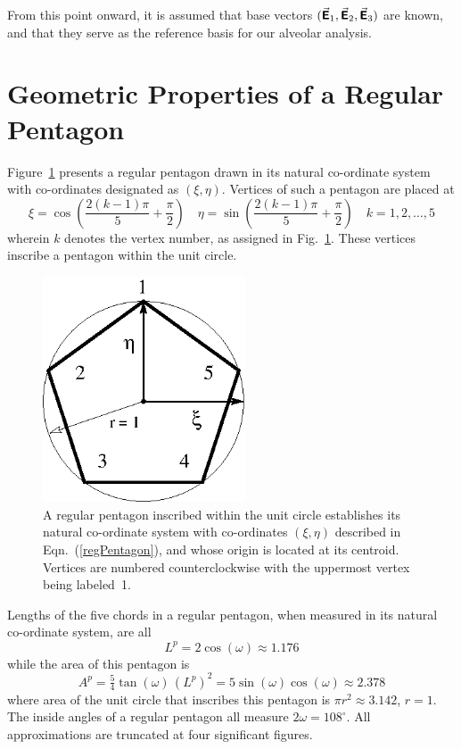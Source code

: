 From this point onward, it is assumed that base vectors $( \vec{\boldsymbol{\mathsf{E}}}_1 , \vec{\boldsymbol{\mathsf{E}}}_2 , \vec{\boldsymbol{\mathsf{E}}}_3 )$ are known, and that they serve as the reference basis for our alveolar analysis.

\section{Geometric Properties of a Regular Pentagon}
\label{sec:pentagonGeometry}

Figure~\ref{figRegPentagon} presents a regular pentagon drawn in its natural co-ordinate system with co-ordinates designated as $(\xi, \eta)$.  Vertices of such a pentagon are placed at
\begin{equation}
	\xi = \cos \left( \frac{2(k-1)\pi}{5} + \frac{\pi}{2} \right) \quad
	\eta = \sin \left( \frac{2(k-1)\pi}{5} + \frac{\pi}{2} \right) \quad
	k = 1, 2, \ldots, 5
	\label{regPentagon}
\end{equation}
wherein $k$ denotes the vertex number, as assigned in Fig.~\ref{figRegPentagon}.  These vertices inscribe a pentagon within the unit circle.

\begin{figure}
	\centering
	\includegraphics[width=6cm]{figures/regPentagon.png}
	\caption{A regular pentagon inscribed within the unit circle establishes its natural co-ordinate system with co-ordinates $(\xi, \eta)$ described in Eqn.~(\ref{regPentagon}), and whose origin is located at its centroid.  Vertices are numbered counter\-clockwise with the uppermost vertex being labeled~1.}
	\label{figRegPentagon}
\end{figure}

Lengths of the five chords in a regular pentagon, when measured in its natural co-ordinate system, are all
\begin{equation}
	L^p = 2 \cos (\omega) \approx 1.176 
	\label{regPentagonLength}
\end{equation}
while the area of this pentagon is
\begin{equation}
	A^p = \tfrac{5}{4} \tan ( \omega ) \, (L^p)^2 = 
	5 \sin (\omega) \cos (\omega) \approx 2.378
	\label{regPentagonArea}
\end{equation}
where area of the unit circle that inscribes this pentagon is $\pi r^2 \approx 3.142$, $r=1$.  The inside angles of a regular pentagon all measure $2\omega = 108^{\circ}$.  All approximations are truncated at four significant figures.

